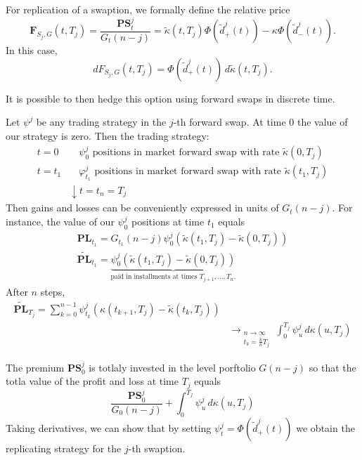 \documentclass[10pt, oneside, reqno]{amsbook}
\theoremstyle{plain}%
\theoremstyle{definition}
\theoremstyle{remark}
\renewcommand{\phi}{\varphi}
\numberwithin{equation}{chapter}
\begin{document}
For replication of a swaption, we formally define the relative price \[
	\mathbf{F}_{S_j, G}(t, T_j) = \frac{\mathbf{PS}_t^j}{G_t(n-j)} = \tilde \kappa(t, T_j) \Phi \left( \tilde d_+^j(t) \right) - \kappa \Phi(\tilde d^j_-(t)).
\]  In this case, \[
	dF_{S_j, G}(t, T_j) = \Phi(\tilde d_+^j(t)) \, d \tilde \kappa(t, T_j).
\]

It is possible to then hedge this option using forward swaps in discrete time.  

Let $\psi^j$ be any trading strategy in the $j$-th forward swap.  At time $0$ the value of our strategy is zero.  Then the trading strategy: \begin{align*}
	t = 0 & \quad \text{$\psi^j_0$ positions in market forward swap with rate $\tilde \kappa(0, T_j)$} \\
	t = t_1  & \quad \text{$\phi^j_{t_1}$ positions in market forward swap with rate $\tilde \kappa(t_1, T_j)$} \\
		&\downarrow
	t = t_n = T_j
\end{align*}  Then gains and losses can be conveniently expressed in units of $G_t(n-j)$.  For instance, the value of our $\psi^j_0$ positions at time $t_1$ equals \begin{align*}
	\mathbf{PL}_{t_1} = G_{t_1}(n-j) \psi^j_0 \left( \tilde \kappa(t_1, T_j) - \tilde \kappa(0, T_j) \right) \\
	\tilde{\mathbf{PL}}_{t_1} = \underbrace{\psi^j_0 \left( \tilde \kappa(t_1, T_j) - \tilde \kappa(0, T_j) \right)}_{\text{paid in installments at times $T_{j+1}, \dots, T_n$.}}
\end{align*}  After $n$ steps, \begin{align*}
	\tilde{\mathbf{PL}}_{T_j} = \sum_{k=0}^{n-1} \psi_{t_k}^j \left( \kappa(t_{k+1}, T_j) - \tilde \kappa(t_k, T_j) \right) \\
	&\rightarrow_{\substack{n \rightarrow \infty \\ t_k = \frac{k}{n} T_j}} \int_0^{T_j} \psi^j_u \, d\kappa(u, T_j) 
\end{align*}

The premium $\mathbf{PS}_0^j$ is totlaly invested in the level porftolio $G(n-j)$ so that the totla value of the profit and loss at time $T_j$ equals \[
	\frac{\mathbf{PS}^j_0}{G_0(n-j)} + \int_0^{T_j} \psi^j_u \, d \kappa(u, T_j)
\]  Taking derivatives, we can show that by setting $\psi^j_t = \Phi \left( \tilde d_+^j(t) \right)$ we obtain the replicating strategy for the $j$-th swaption.
\end{document}
